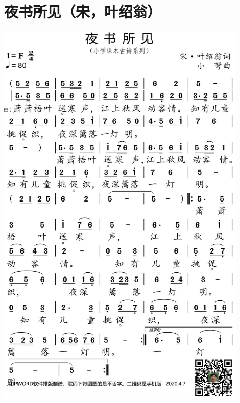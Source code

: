 \documentclass[cn,pad,chinesefont=nofont]{elegantbook}
\begin{document}
\section{夜书所见（宋，叶绍翁）}
    \includegraphics[width=0.9\textwidth]{dongxiao/20200627-古诗-夜书所见.jpg}   
\end{document}

